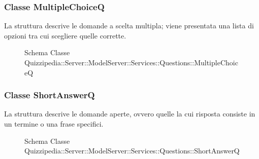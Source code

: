 \subsubsection{Classe MultipleChoiceQ}
La struttura descrive le domande a scelta multipla; viene presentata una lista di opzioni tra cui scegliere quelle corrette.
\begin{figure}[H]
\centering
\noindent{}
\caption{Schema Classe Quizzipedia::Server::ModelServer::Services::Questions::MultipleChoiceQ}
\end{figure}
\subsubsection{Classe ShortAnswerQ}
La struttura descrive le domande aperte, ovvero quelle la cui risposta consiste in un termine o una frase specifici.
\begin{figure}[H]
\centering
\noindent{}
\caption{Schema Classe Quizzipedia::Server::ModelServer::Services::Questions::ShortAnswerQ}
\end{figure}
